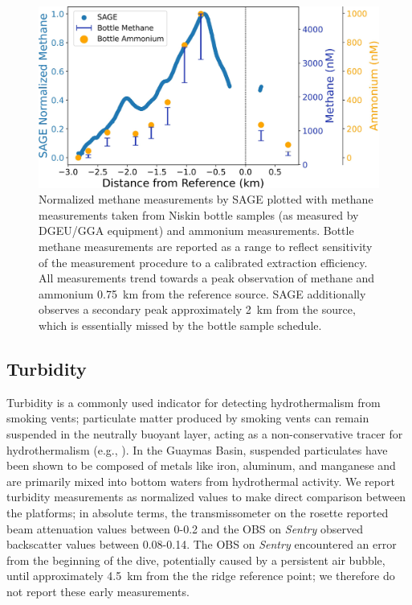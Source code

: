 \begin{figure}[h!]
    \centering
    \includegraphics[width=\columnwidth]{figures/chap3_bottle_norm.jpg}
    \caption{Normalized methane measurements by SAGE plotted with methane measurements taken from Niskin bottle samples (as measured by DGEU/GGA equipment) and ammonium measurements. Bottle methane measurements are reported as a range to reflect sensitivity of the measurement procedure to a calibrated extraction efficiency. All measurements trend towards a peak observation of methane and ammonium \SI{0.75}{\kilo\meter} from the reference source. SAGE additionally observes a secondary peak approximately \SI{2}{\kilo\meter} from the source, which is essentially missed by the bottle sample schedule.}
    \label{fig:bottles}
\end{figure}


\subsection{Turbidity}
\label{sec:turbidity_results}
Turbidity is a commonly used indicator for detecting hydrothermalism from smoking vents; particulate matter produced by smoking vents can remain suspended in the neutrally buoyant layer, acting as a non-conservative tracer for hydrothermalism (e.g., \cite{feely1992tracking}). In the Guaymas Basin, suspended particulates have been shown to be composed of metals like iron, aluminum, and manganese \cite{scholz2019shelf} and are primarily mixed into bottom waters from hydrothermal activity. We report turbidity measurements as normalized values to make direct comparison between the platforms; in absolute terms, the transmissometer on the rosette reported beam attenuation values between 0-0.2 and the OBS on \emph{Sentry} observed backscatter values between 0.08-0.14. The OBS on \emph{Sentry} encountered an error from the beginning of the dive, potentially caused by a persistent air bubble, until approximately \SI{4.5}{\kilo\meter} from the the ridge reference point; we therefore do not report these early measurements. 

